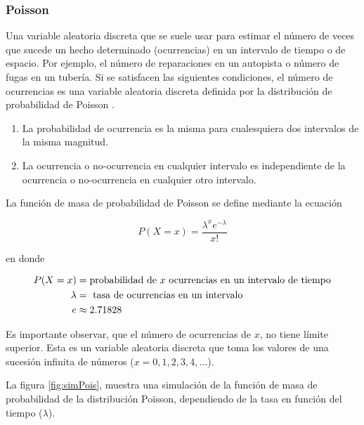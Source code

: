 \documentclass[
  11pt,
]{book}
\providecommand{\tightlist}{%
  \setlength{\itemsep}{0pt}\setlength{\parskip}{0pt}}
\theoremstyle{definition}
\theoremstyle{definition}
\theoremstyle{definition}
\theoremstyle{definition}
\theoremstyle{remark}
\begin{document}
\subsubsection{Poisson}\label{poisson}

Una variable aleatoria discreta que se suele usar para estimar el número de veces que sucede un hecho determinado (ocurrencias) en un intervalo de tiempo o de espacio. Por ejemplo, el número de reparaciones en un autopista o número de fugas en un tubería. Si se satisfacen las siguientes condiciones, el número de ocurrencias es una variable aleatoria discreta definida por la distribución de probabilidad de Poisson \citep[página 211]{anderson}.

\begin{enumerate}
\def\labelenumi{\arabic{enumi}.}
\tightlist
\item
  La probabilidad de ocurrencia es la misma para cualesquiera dos intervalos de la misma magnitud.
\item
  La ocurrencia o no-ocurrencia en cualquier intervalo es independiente de la ocurrencia o no-ocurrencia en cualquier otro intervalo.
\end{enumerate}

La función de masa de probabilidad de Poisson se define mediante la ecuación

\begin{equation}
P(X = x) = \dfrac{\lambda^xe^{-\lambda}}{x!}
\label{eq:poisson}
\end{equation}

en donde

\begin{equation}
\notag
\begin{split}
P(X = x) &= \text{probabilidad de } x \text{ ocurrencias en un intervalo de tiempo}\\
\lambda &= \text{ tasa de ocurrencias en un intervalo}\\
e &\approx 2.71828\\
\end{split}
\end{equation}

Es importante observar, que el número de ocurrencias de \(x\), no tiene límite superior. Esta es un variable aleatoria discreta que toma los valores de una sucesión infinita de números (\(x = 0,1,2,3,4,\ldots\)).

La figura \ref{fig:simPois}, muestra una simulación de la función de masa de probabilidad de la distribución Poisson, dependiendo de la tasa en función del tiempo (\(\lambda\)).
\end{document}
